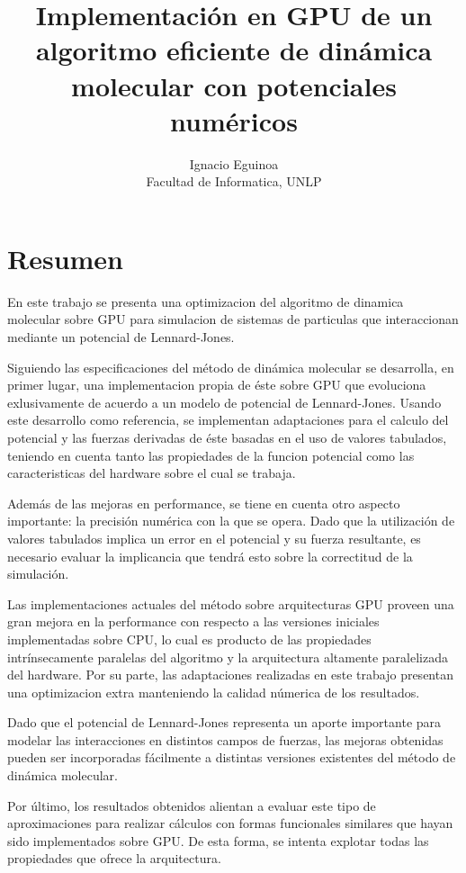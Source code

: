 \documentclass[a4paper,10pt]{report}
\title{Implementación en GPU de un algoritmo eficiente de dinámica molecular con potenciales numéricos}
\author{Ignacio Eguinoa \\ 
\small Facultad de Informatica, UNLP
\date{}
}
\begin{document}
\maketitle



\section*{Resumen} 



En este trabajo se presenta una optimizacion del algoritmo de dinamica molecular sobre GPU para simulacion de sistemas de particulas que interaccionan mediante un potencial de Lennard-Jones. 

Siguiendo las especificaciones del método de dinámica molecular se desarrolla, en primer lugar, una implementacion propia de éste sobre GPU que evoluciona exlusivamente de acuerdo a un modelo de potencial de Lennard-Jones. Usando este desarrollo como referencia, se implementan adaptaciones para el calculo del potencial y las fuerzas derivadas de éste basadas en el uso de valores tabulados, teniendo en cuenta tanto las propiedades de la funcion potencial como las caracteristicas del hardware sobre el cual se trabaja.

Además de las mejoras en performance, se tiene en cuenta otro aspecto importante: la precisión numérica con la que se opera. Dado que la utilización de valores tabulados implica un error en el potencial y su fuerza resultante, es necesario evaluar la implicancia que tendrá esto sobre la correctitud de la simulación.

Las implementaciones actuales del método sobre arquitecturas GPU proveen una gran mejora en la performance con respecto a las versiones iniciales implementadas sobre CPU, lo cual es producto de las propiedades intrínsecamente paralelas del algoritmo y la arquitectura altamente paralelizada del hardware. Por su parte, las adaptaciones realizadas en este trabajo presentan una optimizacion extra manteniendo la calidad númerica de los resultados. 

Dado que el potencial de Lennard-Jones representa un aporte importante para modelar las interacciones en distintos campos de fuerzas, las mejoras obtenidas pueden ser incorporadas fácilmente a distintas versiones existentes del método de dinámica molecular. 

Por último, los resultados obtenidos alientan a evaluar este tipo de aproximaciones para realizar cálculos con formas funcionales similares que hayan sido implementados sobre GPU. De esta forma, se intenta explotar todas las propiedades que ofrece la arquitectura.
\end{document}
